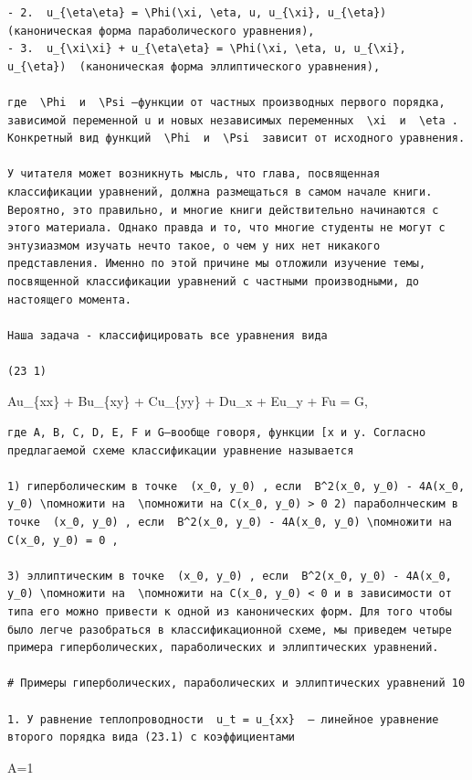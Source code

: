 \documentclass[
  ukrainian,
]{article}
\begin{document}
\begin{verbatim}
- 2.  u_{\eta\eta} = \Phi(\xi, \eta, u, u_{\xi}, u_{\eta})  (каноническая форма параболического уравнения),
- 3.  u_{\xi\xi} + u_{\eta\eta} = \Phi(\xi, \eta, u, u_{\xi}, u_{\eta})  (каноническая форма эллиптического уравнения),

где  \Phi  и  \Psi —функции от частных производных первого порядка, зависимой переменной u и новых независимых переменных  \xi  и  \eta . Конкретный вид функций  \Phi  и  \Psi  зависит от исходного уравнения.

У читателя может возникнуть мысль, что глава, посвященная классификации уравнений, должна размещаться в самом начале книги. Вероятно, это правильно, и многие книги действительно начинаются с этого материала. Однако правда и то, что многие студенты не могут с энтузиазмом изучать нечто такое, о чем у них нет никакого представления. Именно по этой причине мы отложили изучение темы, посвященной классификации уравнений с частными производными, до настоящего момента.

Наша задача - классифицировать все уравнения вида

(23 1)
\end{verbatim}

Au\_\{xx\} + Bu\_\{xy\} + Cu\_\{yy\} + Du\_x + Eu\_y + Fu = G,

\begin{verbatim}
где A, B, C, D, E, F и G—вообще говоря, функции [x и y. Согласно предлагаемой схеме классификации уравнение называется

1) гиперболическим в точке  (x_0, y_0) , если  B^2(x_0, y_0) - 4A(x_0, y_0) \помножити на  \помножити на C(x_0, y_0) > 0 2) параболнческим в точке  (x_0, y_0) , если  B^2(x_0, y_0) - 4A(x_0, y_0) \помножити на C(x_0, y_0) = 0 ,

3) эллиптическим в точке  (x_0, y_0) , если  B^2(x_0, y_0) - 4A(x_0, y_0) \помножити на  \помножити на C(x_0, y_0) < 0 и в зависимости от типа его можно привести к одной из канонических форм. Для того чтобы было легче разобраться в классификационной схеме, мы приведем четыре примера гиперболических, параболических и эллиптических уравнений.

# Примеры гиперболических, параболических и эллиптических уравнений 10

1. У равнение теплопроводности  u_t = u_{xx}  — линейное уравнение второго порядка вида (23.1) с коэффициентами
\end{verbatim}

A=1
\end{document}

